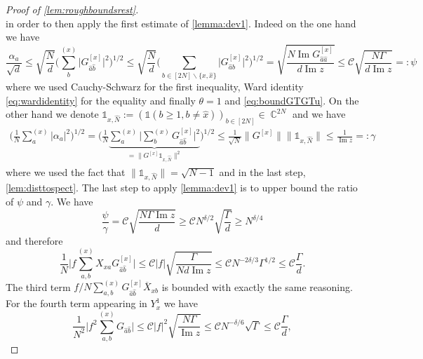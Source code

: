 \documentclass[10pt,a4paper]{amsart}
\DeclareMathOperator{\Ima}{Im}
\DeclareMathOperator{\CC}{\mathbb{C}}
\newcommand{\abs}[1]{\left| #1 \right|}
\newcommand{\absb}[1]{\bigl| #1 \bigr|}
\newcommand{\absbb}[1]{\biggl| #1 \biggr|}
\numberwithin{equation}{section}
\newcommand*\barr[1]{\overline{#1}}
\newcommand*\bset[1]{[#1]}
\newcommand*\ubarr[1]{{\widehat{#1}}}
\begin{document}
\begin{proof}[Proof of \cref{lem:roughboundsrest}]
\begin{equation*}
		\end{equation*}
		in order to then apply the first estimate of \cref{lemma:dev1}. Indeed on the one hand we have
		\begin{equation*}
			\frac{\alpha_a}{\sqrt{d}} \le \sqrt{\frac{N}{d}} \biggl( \sum_{b}^{(x)} \absb{G^{\bset{x}}_{\ubarr{a}\ubarr{b}}}^2 \biggr)^{1/2} \le \sqrt{\frac{N}{d}} \biggl( \sum_{b\in [2N] \backslash \{x,\ubarr{x}\}} \absb{G^{\bset{x}}_{\ubarr{a}b}}^2 \biggr)^{1/2} = \sqrt{\frac{N\Ima G^{\bset{x}}_{\ubarr{a}\ubarr{a}}}{d\Ima z}} \le  \mathcal{C}\sqrt{\frac{N \Gamma}{d\Ima z}}=:\psi
		\end{equation*}
		where we used Cauchy-Schwarz for the first inequality, Ward identity \cref{eq:wardidentity} for the equality and finally $\theta=1$ and \cref{eq:boundGTGTu}. On the other hand we denote $ \mathds{1}_{x,\ubarr{N}}:= (\mathds{1}(b \ge 1, b \neq \ubarr{x}))_{b\in [2N]} \in \CC^{2N}$ and we have
		\begin{align*}
			\biggl(\frac{1}{N}\sum_{a}^{(x)} \abs{\alpha_a}^2 \biggr)^{1/2} = \biggl(\frac{1}{N}\underbrace{\sum_{a}^{(x)} \absbb{\sum_{b}^{(x)} G_{\ubarr{a}\ubarr{b}}^{\bset{x}}}^2}_{= \|G^{\bset{x}}\mathds{1}_{x,\ubarr{N}}\|^2} \biggr)^{1/2} \le \frac{1}{\sqrt{N}} \|G^{\bset{x}}\|\|\mathds{1}_{x,\ubarr{N}}\| \le \frac{1}{\Ima z} =: \gamma
		\end{align*}
		where we used the fact that $\|\mathds{1}_{x,\ubarr{N}}\|= \sqrt{N-1}$ and in the last step, \cref{lem:disttospect}. The last step to apply \cref{lemma:dev1} is to upper bound the ratio of $\psi$ and $\gamma$. We have
		\begin{equation*}
			\frac{\psi}{\gamma} = \mathcal{C}\sqrt{\frac{N \Gamma \Ima z }{d}}\ge \mathcal{C}N^{\delta/2}\sqrt{\frac{\Gamma }{d}} \ge N^{\delta/4}
		\end{equation*}
		and therefore
		\begin{equation}\label{eq:bounddoublesum}
			\frac{1}{N} \absbb{ f\sum_{a,b}^{(x)} X_{xa} G^{\bset{x}}_{\ubarr{a}\ubarr{b}}} \le  \mathcal{C}\abs{ f}\sqrt{\frac{\Gamma}{Nd\Ima z}}\le \mathcal{C}N^{-2\delta/3}\Gamma^{1/2}\le \mathcal C \frac{\Gamma}{d}.
		\end{equation}
		The third term $f/N\sum_{a,b}^{(x)} G_{\ubarr{a}\ubarr{b}}^{\bset{x}} \barr{X}_{xb}$ is bounded with exactly the same reasoning. For the fourth term appearing in $Y^{1}_{x}$ we have
		\begin{equation}\label{eq:upboundforfsquare}
			\frac{1}{N^2 }\absbb{f^2\sum_{a,b}^{(x)} G_{\ubarr{a}\ubarr{b}}} \le  \mathcal{C} \abs{f}^2 \sqrt{ \frac{N \Gamma}{ \Ima z}} \le \mathcal{C} N^{-\delta/6} \sqrt{\Gamma} \le \mathcal{C}\frac{\Gamma}{d},

\end{equation}
\end{proof}
\end{document}
